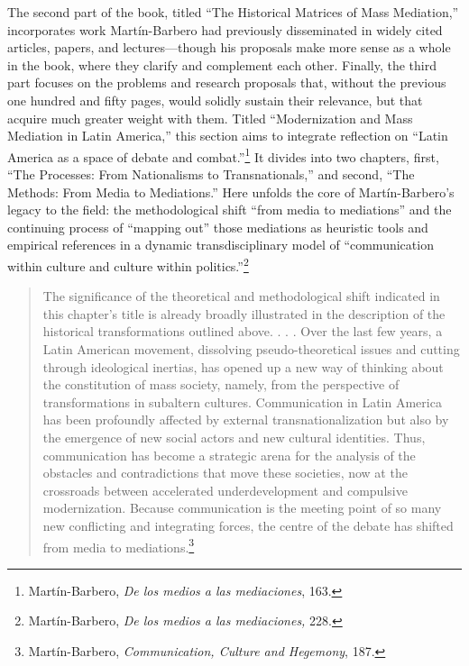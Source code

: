 \documentclass{tufte-handout}
\begin{document}
The second part of the book, titled ``The Historical Matrices of Mass
Mediation,'' incorporates work Martín-Barbero had previously
disseminated in widely cited articles, papers, and lectures---though his
proposals make more sense as a whole in the book, where they clarify and
complement each other. Finally, the third part focuses on the problems
and research proposals that, without the previous one hundred and fifty
pages, would solidly sustain their relevance, but that acquire much
greater weight with them. Titled ``Modernization and Mass Mediation in
Latin America,'' this section aims to integrate reflection on ``Latin
America as a space of debate and
combat.''\footnote{Martín-Barbero, \emph{De los medios a las mediaciones}, 163.
} It divides into two
chapters, first, ``The Processes: From Nationalisms to Transnationals,''
and second, ``The Methods: From Media to Mediations.'' Here unfolds the
core of Martín-Barbero's legacy to the field: the methodological shift
``from media to mediations'' and the continuing process of ``mapping
out'' those mediations as heuristic tools and empirical references in a
dynamic transdisciplinary model of ``communication within culture and
culture within politics.''\footnote{Martín-Barbero, \emph{De los medios a las mediaciones,} 228.
}

\begin{quote}
The significance of the theoretical and methodological shift indicated
in this chapter's title is already broadly illustrated in the
description of the historical transformations outlined above. . . . Over
the last few years, a Latin American movement, dissolving
pseudo-theoretical issues and cutting through ideological inertias, has
opened up a new way of thinking about the constitution of mass society,
namely, from the perspective of transformations in subaltern cultures.
Communication in Latin America has been profoundly affected by external
transnationalization but also by the emergence of new social actors and
new cultural identities. Thus, communication has become a strategic
arena for the analysis of the obstacles and contradictions that move
these societies, now at the crossroads between accelerated
underdevelopment and compulsive modernization. Because communication is
the meeting point of so many new conflicting and integrating forces, the
centre of the debate has shifted from media to
mediations.\footnote{Martín-Barbero, \emph{Communication, Culture and Hegemony}, 187.
}
\end{quote}
\end{document}

